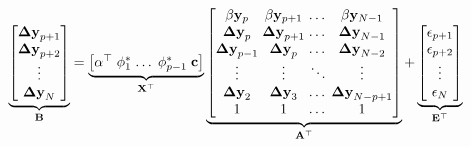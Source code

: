 \begin{equation}
 \label{eq:vecmatrix}
\underbrace{
      \begin{bmatrix}
       \mathbf{\Delta y}_{p+1}  \\ 
       \mathbf{\Delta y}_{p+2}  \\ 
       \vdots                   \\ 
       \mathbf{\Delta y}_N      
      \end{bmatrix}}_{\mathbf{B} } =
\arraycolsep=1.4pt  
\underbrace{\begin{bmatrix}
   \alpha^\top & \phi^*_1 & \dots & \phi^*_{p-1} &\mathbf{c}   
  \end{bmatrix}}_{\mathbf{X}^\top}
\underbrace{\begin{bmatrix}
 \beta\mathbf{y}_p      & \beta\mathbf{y}_{p+1}   & \dots&   \beta\mathbf{y}_{N-1}   \\
 \mathbf{\Delta y}_{p}   & \mathbf{\Delta y}_{p+1}& \dots &  \mathbf{\Delta y}_{N-1} \\
 \mathbf{\Delta y}_{p-1} & \mathbf{\Delta y}_{p}  & \dots &  \mathbf{\Delta y}_{N-2}   \\
 \vdots                  & \vdots                 & \ddots&  \vdots                   \\
 \mathbf{\Delta y}_{2}   & \mathbf{\Delta y}_{3} & \dots &   \mathbf{\Delta y}_{N-p+1} \\
 1                      & 1                       & \dots     & 1   
 \end{bmatrix}}_{\mathbf{A}^\top}
+
\underbrace{\begin{bmatrix}
              \mathbf{\epsilon}_{p+1} \\ 
              \mathbf{\epsilon}_{p+2} \\ 
              \vdots \\ 
              \mathbf{\epsilon}_N
             \end{bmatrix}}_{\mathbf{E}^\top}
\end{equation}
